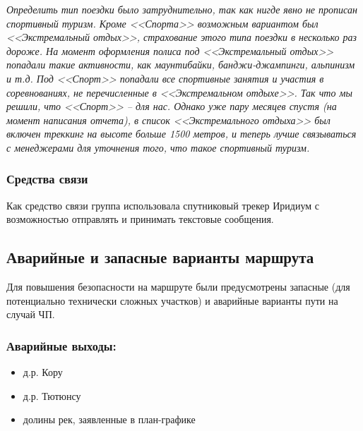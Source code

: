 			\textit{Определить тип поездки было затруднительно, так как нигде явно не прописан спортивный туризм.
			Кроме <<Спорта>> возможным вариантом был <<Экстремальный отдых>>, страхование этого типа поездки в
			несколько раз дороже. На момент оформления полиса под <<Экстремальный отдых>> попадали такие активности,
			как маунтибайки, банджи-джампинги, альпинизм и т.д. Под <<Спорт>> попадали все спортивные занятия и
			участия в соревнованиях, не перечисленные в <<Экстремальном отдыхе>>. Так что мы решили, что
			<<Спорт>> -- для нас. Однако уже пару месяцев спустя (на момент написания отчета), в список
			<<Экстремального отдыха>> был включен треккинг на высоте больше 1500 метров, и теперь лучше связываться
			с менеджерами для уточнения того, что такое спортивный туризм.}

		\subsubsection{Средства связи}
			Как средство связи группа использовала спутниковый трекер Иридиум с возможностью отправлять и принимать текстовые сообщения. 

	\subsection{Аварийные и запасные варианты маршрута}
		Для повышения безопасности на маршруте были предусмотрены запасные (для потенциально технически сложных участков) и 
		аварийные варианты пути  на случай ЧП.

		\subsubsection*{Аварийные выходы:}
			\begin{itemize}
				\item д.р. Кору
				\item д.р. Тютюнсу
				\item долины рек, заявленные в план-графике
			\end{itemize}

